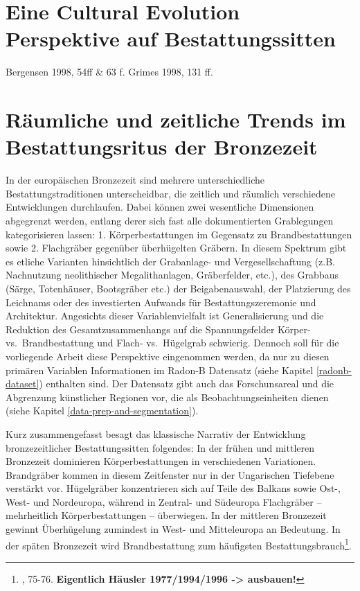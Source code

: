 \documentclass[openany,twoside,twocolumn]{book}
\let\rmarkdownfootnote\footnote%
\def\footnote{\protect\rmarkdownfootnote}
\begin{document}
\hypertarget{eine-cultural-evolution-perspektive-auf-bestattungssitten}{%
\section{Eine Cultural Evolution Perspektive auf
Bestattungssitten}\label{eine-cultural-evolution-perspektive-auf-bestattungssitten}}

Bergensen 1998, 54ff \& 63 f. Grimes 1998, 131 ff.

\hypertarget{regions-archaeological-overview}{%
\section{Räumliche und zeitliche Trends im Bestattungsritus der
Bronzezeit}\label{regions-archaeological-overview}}

In der europäischen Bronzezeit sind mehrere unterschiedliche
Bestattungstraditionen unterscheidbar, die zeitlich und räumlich
verschiedene Entwicklungen durchlaufen. Dabei können zwei wesentliche
Dimensionen abgegrenzt werden, entlang derer sich fast alle
dokumentierten Grablegungen kategorisieren lassen: 1. Körperbestattungen
im Gegensatz zu Brandbestattungen sowie 2. Flachgräber gegenüber
überhügelten Gräbern. In diesem Spektrum gibt es etliche Varianten
hinsichtlich der Grabanlage- und Vergesellschaftung (z.B. Nachnutzung
neolithischer Megalithanlagen, Gräberfelder, etc.), des Grabbaus (Särge,
Totenhäuser, Bootsgräber etc.) der Beigabenauswahl, der Platzierung des
Leichnams oder des investierten Aufwands für Bestattungszeremonie und
Architektur. Angesichts dieser Variablenvielfalt ist Generalisierung und
die Reduktion des Gesamtzusammenhangs auf die Spannungsfelder Körper-
vs.~Brandbestattung und Flach- vs.~Hügelgrab schwierig. Dennoch soll für
die vorliegende Arbeit diese Perspektive eingenommen werden, da nur zu
diesen primären Variablen Informationen im Radon-B Datensatz (siehe
Kapitel \ref{radonb-dataset}) enthalten sind. Der Datensatz gibt auch
das Forschunsareal und die Abgrenzung künstlicher Regionen vor, die als
Beobachtungseinheiten dienen (siehe Kapitel
\ref{data-prep-and-segmentation}).

Kurz zusammengefasst besagt das klassische Narrativ der Entwicklung
bronzezeitlicher Bestattungssitten folgendes: In der frühen und
mittleren Bronzezeit dominieren Körperbestattungen in verschiedenen
Variationen. Brandgräber kommen in diesem Zeitfenster nur in der
Ungarischen Tiefebene verstärkt vor. Hügelgräber konzentrieren sich auf
Teile des Balkans sowie Ost-, West- und Nordeuropa, während in Zentral-
und Südeuropa Flachgräber -- mehrheitlich Körperbestattungen --
überwiegen. In der mittleren Bronzezeit gewinnt Überhügelung zumindest
in West- und Mitteleuropa an Bedeutung. In der späten Bronzezeit wird
Brandbestattung zum häufigsten Bestattungsbrauch\footnote{\textcite{harding_european_2000},
  75-76. \textbf{Eigentlich Häusler 1977/1994/1996 -\textgreater{}
  ausbauen!}}.
\end{document}
